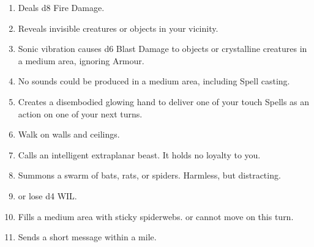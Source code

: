 \documentclass[itdr]{subfiles}
\begin{document}
\begin{enumerate}
	\item {} Deals d8 Fire Damage.
	\item {} Reveals invisible creatures or objects in your vicinity.
	\item {} Sonic vibration causes d6 Blast Damage to objects or crystalline creatures in a medium area, ignoring Armour.
	\item {} No sounds could be produced in a medium area, including Spell casting.
	\item {} Creates a disembodied glowing hand to deliver one of your touch Spells as an action on one of your next turns.
	\item {} Walk on walls and ceilings.
	\item {} Calls an intelligent extraplanar beast. It holds no loyalty to you.
	\item {} Summons a swarm of bats, rats, or spiders. Harmless, but distracting.
	\item {}  or lose d4 WIL.
	\item {} Fills a medium area with sticky spiderwebs.  or cannot move on this turn.
	\item {} Sends a short message within a mile.
\end{enumerate}

\vfill
\break
\end{document}
